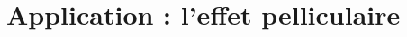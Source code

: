 \section{Application : l'effet pelliculaire}

	
	
	
	
	
	
	
	
	
	
	
	
	
	
	
	
	
	
	
	
	
	
	
	
	
	
	
	
	
	
	
	
	
	
	
	
	
	
	